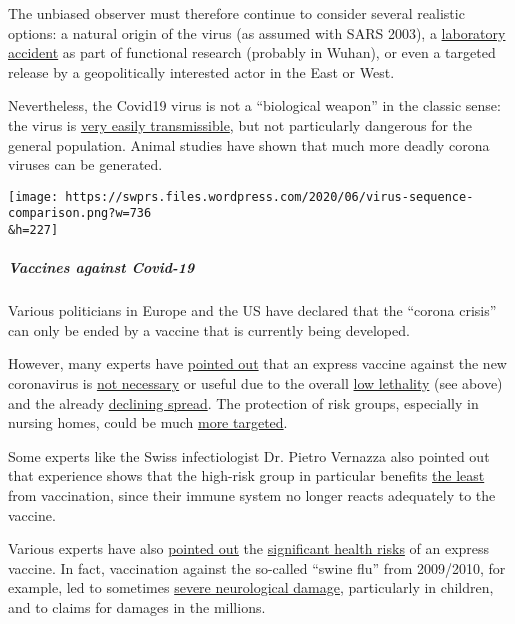 The unbiased observer must therefore continue to consider several
realistic options: a natural origin of the virus (as assumed with SARS
2003), a \href{https://project-evidence.github.io/}{laboratory accident}
as part of functional research (probably in Wuhan), or even a targeted
release by a geopolitically interested actor in the East or West.

Nevertheless, the Covid19 virus is not a ``biological weapon'' in the
classic sense: the virus is
\href{https://leelabvirus.host/covid19/origins-part2}{very easily
transmissible}, but not particularly dangerous for the general
population. Animal studies have shown that much more deadly corona
viruses can be generated.

\texttt{[image: https://swprs.files.wordpress.com/2020/06/virus-sequence-comparison.png?w=736\\\&h=227]}

\hypertarget{vaccines-against-covid-19}{%
\subparagraph{\texorpdfstring{\textbf{Vaccines against
Covid-19}}{Vaccines against Covid-19}}\label{vaccines-against-covid-19}}

Various politicians in Europe and the US have declared that the ``corona
crisis'' can only be ended by a vaccine that is currently being
developed.

However, many experts have
\href{https://www.nature.com/articles/d41586-020-00751-9}{pointed out}
that an express vaccine against the new coronavirus is
\href{https://www.youtube.com/watch?v=vrL9QKGQrWk}{not necessary} or
useful due to the overall
\href{https://www.bitchute.com/video/DXxeej9CW1pz/}{low lethality} (see
above) and the already
\href{https://www.news.com.au/lifestyle/health/health-problems/no-vaccine-for-coronavirus-a-possibility/news-story/34e678ae205b50ea983cc64ab2943608}{declining
spread}. The protection of risk groups, especially in nursing homes,
could be much
\href{https://www.reuters.com/article/us-health-coronavirus-haseltine-newsmake-idUSKBN22W34T}{more
targeted}.

Some experts like the Swiss infectiologist Dr. Pietro Vernazza also
pointed out that experience shows that the high-risk group in particular
benefits
\href{https://infekt.ch/2020/05/corona-impfung-als-ultimative-rettung/}{the
least} from vaccination, since their immune system no longer reacts
adequately to the vaccine.

Various experts have also
\href{https://www.nature.com/articles/d41586-020-00751-9}{pointed out}
the
\href{https://www.reuters.com/article/us-health-coronavirus-vaccines-insight-idUSKBN20Y1GZ}{significant
health risks} of an express vaccine. In fact, vaccination against the
so-called ``swine flu'' from 2009/2010, for example, led to sometimes
\href{https://www.ibtimes.co.uk/brain-damaged-uk-victims-swine-flu-vaccine-get-60-million-compensation-1438572}{severe
neurological damage,} particularly in children, and to claims for
damages in the millions.

